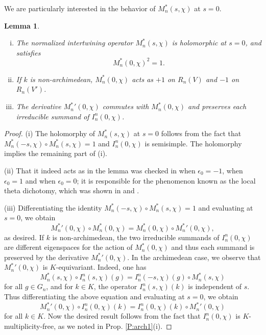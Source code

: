 \documentclass[10pt]{amsart}
\theoremstyle{plain}
\newtheorem{Lem}[equation]{Lemma}
\numberwithin{equation}{section}
\begin{document}
 We are particularly interested in the behavior of $M^*_n(s,\chi)$ at $s = 0$.
 \vskip 5pt
 
 \begin{Lem} \label{L:Mat0}
\begin{enumerate}[(i)]
 \item The normalized intertwining operator $M_n^*(s,\chi)$ is
   holomorphic at $s = 0$, and satisfies
 \[  M_n^*(0,\chi)^2 = 1. \]
\item If $k$ is non-archimedean, $M_n^*(0,\chi)$ acts as $+1$ on
  $R_n(V)$ and $-1$ on $R_n(V')$. 
\item The derivative ${M_n^*}'(0,\chi)$ commutes with $M_n^*(0,\chi)$
  and preserves each irreducible summand of $I^n_n(0,\chi)$.  
\end{enumerate}
 \end{Lem}
 \vskip 5pt
 
 \begin{proof}
 (i) The holomorphy of $M_n^*(s,\chi)$ at $s = 0$ follows from the
 fact that $M^*_n(-s, \chi) \circ M^*_n(s, \chi)  =1$ and $I^n_n(0,
 \chi)$ is semisimple. The holomorphy implies the remaining part of (i).
\vskip 5pt

(ii) That it indeed acts as in the lemma was checked in
 \cite{GT} when $\epsilon_0  =-1$, \cite[Lemma 7.2]{GS} when $\epsilon_0 =1$ and
 \cite{HKS, KS} when $\epsilon_0 = 0$; it
 is responsible for the
 phenomenon known as the local theta dichotomy, which was shown in
 \cite{HKS} and \cite{GS}.
 \vskip 5pt
 
 (iii) Differentiating the identity $M^*_n(-s, \chi) \circ M^*_n(s,
 \chi)  =1$ and evaluating at $s = 0$, we obtain
 \[  {M_n^*}'(0,\chi) \circ M_n^*(0,\chi) = 
 M_n^*(0,\chi) \circ  {M_n^*}'(0,\chi), \]
 as desired. If $k$ is non-archimedean, 
  the two irreducible summands of $I_n^n(0,\chi)$ are different
  eigenspaces for the action of $M^*_n(0,\chi)$ and thus each summand
  is  preserved by the derivative  ${M_n^*}'(0,\chi)$. In the
  archimedean case, we observe that  ${M_n^*}'(0,\chi)$ is
  $K$-equivariant. Indeed, one has
  \[  M_n^*(s,\chi) \circ I_n^n(s, \chi)(g)  =  I_n^n(-s,\chi)(g) \circ M_n^*(s,\chi) \]
  for all $g \in G_n$, and for $k \in K$, the operator
  $I_n^n(s,\chi)(k)$ is independent of $s$. Thus differentiating the
  above equation and evaluating at $s = 0$, we obtain
 \[  {M_n^*}'(0,\chi) \circ I_n^n(0, \chi)(k)  =  I_n^n(0,\chi)(k) \circ {M_n^*}'(0,\chi) \]
 for all $k \in K$.
  Now the desired result follows from the fact that $I^n_n(0,\chi)$ is
  $K$-multiplicity-free, as we noted in Prop. \ref{P:arch1}(i).  
\end{proof}
  \vskip 15pt
 
\end{document}
